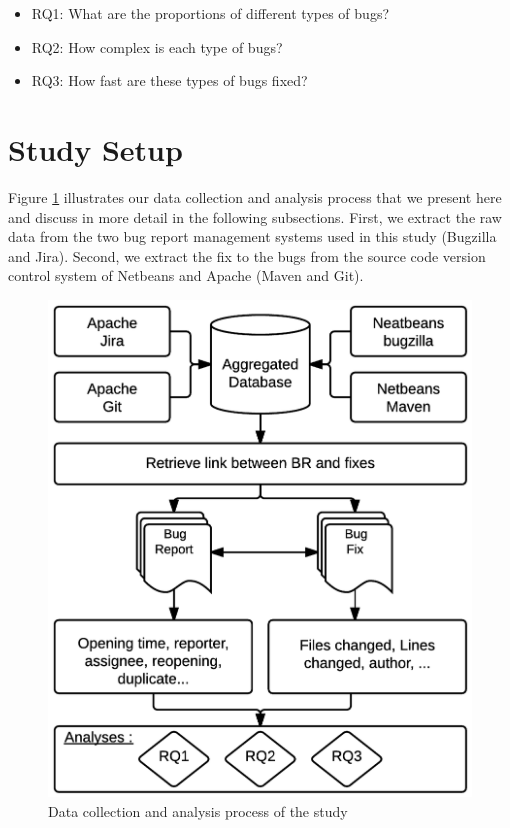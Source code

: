 \begin{itemize}
	\item RQ1: What are the proportions of different types of bugs?
	\item RQ2: How complex is each type of bugs?
	\item RQ3: How fast are these types of bugs fixed?
\end{itemize}


\section{Study Setup}

Figure \ref{fig:bug-taxo-flow} illustrates our data collection and analysis
process that we present here and discuss in more detail in the
following subsections. First, we extract the raw data from the
two bug report management systems used in this study
(Bugzilla and Jira). Second, we extract the fix to the bugs
from the source code version control system of Netbeans and
Apache (Maven and Git).

\begin{figure}[h!]
  \centering
    \includegraphics{media/bug-taxo-flow.png}
    \caption{Data collection and analysis process of the study
    \label{fig:bug-taxo-flow}}
\end{figure}


